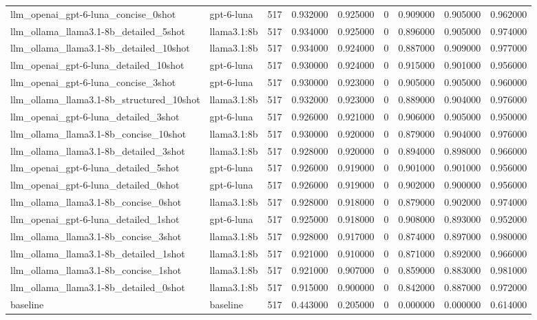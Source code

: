 \begin{tabular}{llrrrrrrr}
llm_openai_gpt-6-luna_concise_0shot & gpt-6-luna & 517 & 0.932000 & 0.925000 & 0 & 0.909000 & 0.905000 & 0.962000 \\
llm_ollama_llama3.1-8b_detailed_5shot & llama3.1:8b & 517 & 0.934000 & 0.925000 & 0 & 0.896000 & 0.905000 & 0.974000 \\
llm_ollama_llama3.1-8b_detailed_10shot & llama3.1:8b & 517 & 0.934000 & 0.924000 & 0 & 0.887000 & 0.909000 & 0.977000 \\
llm_openai_gpt-6-luna_detailed_10shot & gpt-6-luna & 517 & 0.930000 & 0.924000 & 0 & 0.915000 & 0.901000 & 0.956000 \\
llm_openai_gpt-6-luna_concise_3shot & gpt-6-luna & 517 & 0.930000 & 0.923000 & 0 & 0.905000 & 0.905000 & 0.960000 \\
llm_ollama_llama3.1-8b_structured_10shot & llama3.1:8b & 517 & 0.932000 & 0.923000 & 0 & 0.889000 & 0.904000 & 0.976000 \\
llm_openai_gpt-6-luna_detailed_3shot & gpt-6-luna & 517 & 0.926000 & 0.921000 & 0 & 0.906000 & 0.905000 & 0.950000 \\
llm_ollama_llama3.1-8b_concise_10shot & llama3.1:8b & 517 & 0.930000 & 0.920000 & 0 & 0.879000 & 0.904000 & 0.976000 \\
llm_ollama_llama3.1-8b_detailed_3shot & llama3.1:8b & 517 & 0.928000 & 0.920000 & 0 & 0.894000 & 0.898000 & 0.966000 \\
llm_openai_gpt-6-luna_detailed_5shot & gpt-6-luna & 517 & 0.926000 & 0.919000 & 0 & 0.901000 & 0.901000 & 0.956000 \\
llm_openai_gpt-6-luna_detailed_0shot & gpt-6-luna & 517 & 0.926000 & 0.919000 & 0 & 0.902000 & 0.900000 & 0.956000 \\
llm_ollama_llama3.1-8b_concise_0shot & llama3.1:8b & 517 & 0.928000 & 0.918000 & 0 & 0.879000 & 0.902000 & 0.974000 \\
llm_openai_gpt-6-luna_detailed_1shot & gpt-6-luna & 517 & 0.925000 & 0.918000 & 0 & 0.908000 & 0.893000 & 0.952000 \\
llm_ollama_llama3.1-8b_concise_3shot & llama3.1:8b & 517 & 0.928000 & 0.917000 & 0 & 0.874000 & 0.897000 & 0.980000 \\
llm_ollama_llama3.1-8b_detailed_1shot & llama3.1:8b & 517 & 0.921000 & 0.910000 & 0 & 0.871000 & 0.892000 & 0.966000 \\
llm_ollama_llama3.1-8b_concise_1shot & llama3.1:8b & 517 & 0.921000 & 0.907000 & 0 & 0.859000 & 0.883000 & 0.981000 \\
llm_ollama_llama3.1-8b_detailed_0shot & llama3.1:8b & 517 & 0.915000 & 0.900000 & 0 & 0.842000 & 0.887000 & 0.972000 \\
baseline & baseline & 517 & 0.443000 & 0.205000 & 0 & 0.000000 & 0.000000 & 0.614000 \\
\bottomrule
\end{tabular}
